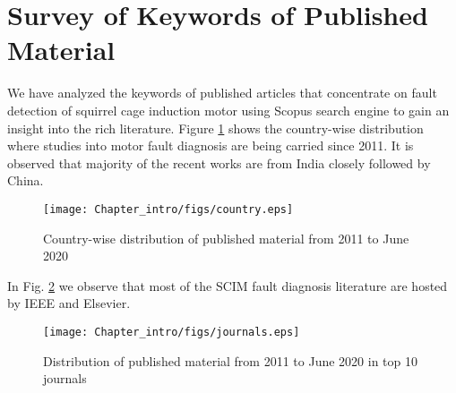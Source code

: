 \section{Survey of Keywords of Published Material}
We have analyzed the keywords of published articles that concentrate on fault detection of squirrel cage induction motor using Scopus search engine to gain an insight into the rich literature. Figure \ref{Fig:country} shows the country-wise distribution where studies into motor fault diagnosis are being carried since 2011. It is observed that majority of the recent works are from India closely followed by China. 
\begin{figure}[h] \centering
{\texttt{[image: Chapter\_intro/figs/country.eps]}} \caption{Country-wise distribution of published material from 2011 to June 2020} \label{Fig:country}
\end{figure}

In Fig. \ref{Fig:journals} we observe that most of the SCIM fault diagnosis literature are hosted by IEEE and Elsevier.
\begin{figure}[h] \centering
	{\texttt{[image: Chapter\_intro/figs/journals.eps]}} \caption{Distribution of published material from 2011 to June 2020 in top 10 journals} 
	\label{Fig:journals}
\end{figure}



